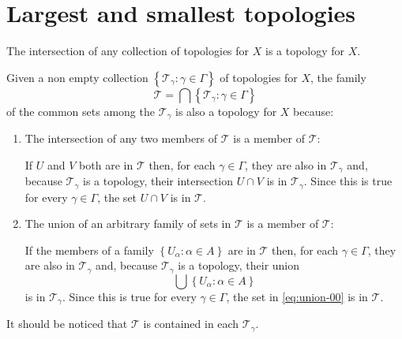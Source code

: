 \section{Largest and smallest topologies}\label{sec:largest-and-smallest-topologies}

\begin{problem}
  The intersection of any collection of topologies for \(X\) is a topology for
  \(X\).
  \label{problem:the-intersection-of-topologies-is-again-a-topology}
\end{problem}

\begin{solution}
  Given a non empty collection
  \(\left\{\mathcal{T}_{\gamma}:\gamma\in\Gamma\right\}\) of topologies for
  \(X\), the family
  \[
    \mathcal{T}=\bigcap\left\{\mathcal{T}_{\gamma}:\gamma\in\Gamma\right\}
  \]
  of the common sets among the \(\mathcal{T}_{\gamma}\) is also a topology for
  \(X\) because:
  \begin{enumerate}
    \item
      The intersection of any two members of \(\mathcal{T}\) is a member of
      \(\mathcal{T}\):

      If \(U\) and \(V\) both are in \(\mathcal{T}\) then, for each
      \(\gamma\in\Gamma\), they are also in \(\mathcal{T}_{\gamma}\) and,
      because \(\mathcal{T}_{\gamma}\) is a topology, their intersection
      \(U\cap{V}\) is in \(\mathcal{T}_{\gamma}\). Since this is true for every
      \(\gamma\in\Gamma\), the set \(U\cap{V}\) is in \(\mathcal{T}\).

    \item
      The union of an arbitrary family of sets in \(\mathcal{T}\) is a member
      of \(\mathcal{T}\):

      If the members of a family \(\left\{U_{\alpha}:\alpha\in{A}\right\}\) are
      in \(\mathcal{T}\) then, for each \(\gamma\in\Gamma\), they are also in
      \(\mathcal{T}_{\gamma}\) and, because \(\mathcal{T}_{\gamma}\) is a
      topology, their union
      \begin{equation}
        \bigcup\left\{U_{\alpha}:\alpha\in{A}\right\}
        \label{eq:union-00}
      \end{equation}
      is in \(\mathcal{T}_{\gamma}\). Since this is true for every
      \(\gamma\in\Gamma\), the set in \eqref{eq:union-00} is in
      \(\mathcal{T}\).

  \end{enumerate}
  It should be noticed that \(\mathcal{T}\) is contained in each
  \(\mathcal{T}_{\gamma}\).
\end{solution}

